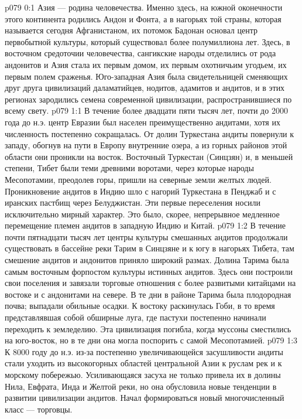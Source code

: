 \author{Архангел}
\vs p079 0:1 Азия --- родина человечества. Именно здесь, на южной оконечности этого континента родились Андон и Фонта, а в нагорьях той страны, которая называется сегодня Афганистаном, их потомок Бадонан основал центр первобытной культуры, который существовал более полумиллиона лет. Здесь, в восточном средоточии человечества, сангикские народы отделились от рода андонитов и Азия стала их первым домом, их первым охотничьим угодьем, их первым полем сраженья. Юго\hyp{}западная Азия была свидетельницей сменяющих друг друга цивилизаций даламатийцев, нодитов, адамитов и андитов, и в этих регионах зародились семена современной цивилизации, распространившиеся по всему свету.
\vs p079 1:1 В течение более двадцати пяти тысяч лет, почти до 2000 года до н.э. центр Евразии был населен преимущественно андитами, хотя их численность постепенно сокращалась. От долин Туркестана андиты повернули к западу, обогнув на пути в Европу внутренние озера, а из горных районов этой области они проникли на восток. Восточный Туркестан (Синцзян) и, в меньшей степени, Тибет были теми древними воротами, через которые народы Месопотамии, преодолев горы, пришли на северные земли желтых людей. Проникновение андитов в Индию шло с нагорий Туркестана в Пенджаб и с иранских пастбищ через Белуджистан. Эти первые переселения носили исключительно мирный характер. Это было, скорее, непрерывное медленное перемещение племен андитов в западную Индию и Китай.
\vs p079 1:2 \pc В течение почти пятнадцати тысяч лет центры культуры смешанных андитов продолжали существовать в бассейне реки Тарим в Синцзяне и к югу в нагорьях Тибета, там смешение андитов и андонитов приняло широкий размах. Долина Тарима была самым восточным форпостом культуры истинных андитов. Здесь они построили свои поселения и завязали торговые отношения с более развитыми китайцами на востоке и с андонитами на севере. В те дни в районе Тарима была плодородная почва; выпадали обильные осадки. К востоку раскинулась Гоби, в то время представлявшая собой обширные луга, где пастухи постепенно начинали переходить к земледелию. Эта цивилизация погибла, когда муссоны сместились на юго\hyp{}восток, но в те дни она могла поспорить с самой Месопотамией.
\vs p079 1:3 \pc К 8000 году до н.э. из\hyp{}за постепенно увеличивающейся засушливости андиты стали уходить из высокогорных областей центральной Азии к руслам рек и к морскому побережью. Усиливающаяся засуха не только привела их в долины Нила, Евфрата, Инда и Желтой реки, но она обусловила новые тенденции в развитии цивилизации андитов. Начал формироваться новый многочисленный класс --- торговцы.
